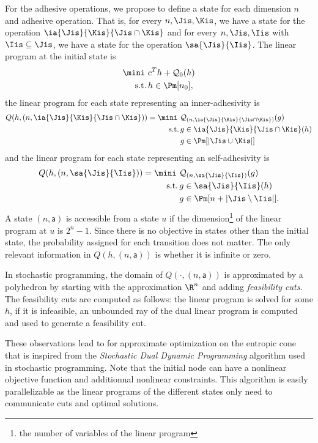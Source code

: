 \documentclass[12pt]{article}
\begin{document}
For the adhesive operations,
we propose to define a state for each dimension $n$ and adhesive operation.
That is, for every $n, \Jis, \Kis$,
we have a state for the operation
$\ia{\Jis}{\Kis}{\Jis \cap \Kis}$
and for every $n, \Jis, \Iis$ with $\Iis \subseteq \Jis$,
we have a state for the operation $\sa{\Jis}{\Iis}$.
The linear program at the initial state is
\begin{align*}
  \mini\,\, & c^T h + \mathcal{Q}_0(h)\\
  \text{s.t.} \,& h \in \Pm[n_0],
\end{align*}
the linear program for each state representing an inner-adhesivity is
\begin{align*}
  Q(h, (n, \ia{\Jis}{\Kis}{\Jis \cap \Kis})) = \mini\,\, & \mathcal{Q}_{(n, \ia{\Jis}{\Kis}{\Jis \cap \Kis})}(g)\\
  \text{s.t.} \,& g \in \ia{\Jis}{\Kis}{\Jis \cap \Kis}(h)\\\
                & g \in \Pm[|\Jis\cup\Kis|]
\end{align*}
and the linear program for each state representing an self-adhesivity is
\begin{align*}
  Q(h, (n, \sa{\Jis}{\Iis})) = \mini\,\, & \mathcal{Q}_{(n, \sa{\Jis}{\Iis})}(g)\\
  \text{s.t.} \,& g \in \sa{\Jis}{\Iis}(h)\\\
                & g \in \Pm[n + |\Jis \setminus \Iis|].
\end{align*}
A state $(n, \mathsf{a})$ is accessible from a state $u$ if the dimension\footnote{the number of variables of the linear program} of the linear program at $u$ is $2^n-1$.
Since there is no objective in states other than the initial state, the probability assigned for each transition does not matter.
The only relevant information in $Q(h, (n, \mathsf{a}))$ is whether it is infinite or zero.

In stochastic programming, the domain of $Q(\cdot, (n, \mathsf{a}))$ is approximated by a polyhedron
by starting with the approximation $\R^n$ and adding \emph{feasibility cuts}.
The feasibility cuts are computed as follows:
the linear program is solved for some $h$,
if it is infeasible, an unbounded ray of the dual linear program is computed and used to generate a feasibility cut.

These observations lead to \algoref{Ec} for approximate optimization on the entropic cone that is inspired from the \emph{Stochastic Dual Dynamic Programming} algorithm used in stochastic programming.
Note that the initial node can have a nonlinear objective function and additionnal nonlinear constraints.
This algorithm is easily parallelizable as the linear programs of the different states only need to communicate cuts and optimal solutions.
\end{document}
